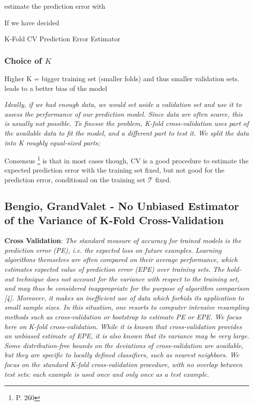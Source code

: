 estimate the prediction error with



 If we have decided 



\begin{definition}{K-Fold CV Prediction Error Estimator}

\end{definition}

\subsubsection{Choice of $K$} 

Higher K = bigger training set (smaller folds) and thus smaller validation sets. leads to a better bias of the model 

\textit{Ideally, if we had enough data, we would set aside a validation set and use it to assess the performance of our prediction model. Since data are often scarce, this is usually not possible. To finesse the problem, K-fold cross-validation uses part of the available data to fit the model, and a different part to test it. We split the data into K roughly equal-sized parts; }


Consensus \footnote{\cite{hastie-elemstatslearn} P. 260} is that in most cases though, CV is a good procedure to estimate the expected prediction error with the training set fixed, but not good for the prediction error, conditional on the training set $\mathcal{T}$ fixed.


\subsection{Bengio, GrandValet - No Unbiased Estimator of the Variance of K-Fold Cross-Validation}
\textbf{Cross Validation}: 
\textit{The standard measure of accuracy for trained models is the prediction error (PE), i.e. the expected loss on future examples. Learning algorithms themselves are often compared on their average performance, which estimates expected value of prediction error (EPE) over training sets.
	The hold-out technique does not account for the variance with respect to the training set, and may thus be considered inappropriate for the purpose of algorithm comparison [4]. Moreover, it makes an inefficient use of data which forbids its application to small sample sizes. In this situation, one resorts to computer intensive resampling methods such as cross-validation or bootstrap to estimate PE or EPE. We focus here on K-fold cross-validation. While it is known that cross-validation provides an unbiased estimate of EPE, it is also known that its variance may be very large.
	Some distribution-free bounds on the deviations of cross-validation are available, but they are specific to locally defined classifiers, such as nearest neighbors.
	We focus on the standard K-fold cross-validation procedure, with no overlap between test sets: each example is used once and only once as a test example.
}


